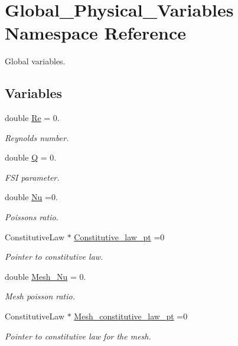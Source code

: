 \hypertarget{namespaceGlobal__Physical__Variables}{}\section{Global\+\_\+\+Physical\+\_\+\+Variables Namespace Reference}
\label{namespaceGlobal__Physical__Variables}


Global variables.  


\subsection*{Variables}
\begin{DoxyCompactItemize}
\item 
double \hyperlink{namespaceGlobal__Physical__Variables_ab814e627d2eb5bc50318879d19ab16b9}{Re} = 0.
\begin{DoxyCompactList}\small\item\em Reynolds number. \end{DoxyCompactList}\item 
double \hyperlink{namespaceGlobal__Physical__Variables_a66cb7ecda9ba0cd72367dd697f154545}{Q} = 0.
\begin{DoxyCompactList}\small\item\em F\+SI parameter. \end{DoxyCompactList}\item 
double \hyperlink{namespaceGlobal__Physical__Variables_a3962c36313826b19f216f6bbbdd6a477}{Nu} =0.
\begin{DoxyCompactList}\small\item\em Poisson\textquotesingle{}s ratio. \end{DoxyCompactList}\item 
Constitutive\+Law $\ast$ \hyperlink{namespaceGlobal__Physical__Variables_a2a37fb040c832ee7a086bb13bb02a100}{Constitutive\+\_\+law\+\_\+pt} =0
\begin{DoxyCompactList}\small\item\em Pointer to constitutive law. \end{DoxyCompactList}\item 
double \hyperlink{namespaceGlobal__Physical__Variables_a0f1535b448627cbfa0acfb742120d96f}{Mesh\+\_\+\+Nu} = 0.
\begin{DoxyCompactList}\small\item\em Mesh poisson ratio. \end{DoxyCompactList}\item 
Constitutive\+Law $\ast$ \hyperlink{namespaceGlobal__Physical__Variables_aac1b52d0b82bc48d24dfcb031d9dc25f}{Mesh\+\_\+constitutive\+\_\+law\+\_\+pt} =0
\begin{DoxyCompactList}\small\item\em Pointer to constitutive law for the mesh. \end{DoxyCompactList}\end{DoxyCompactItemize}


